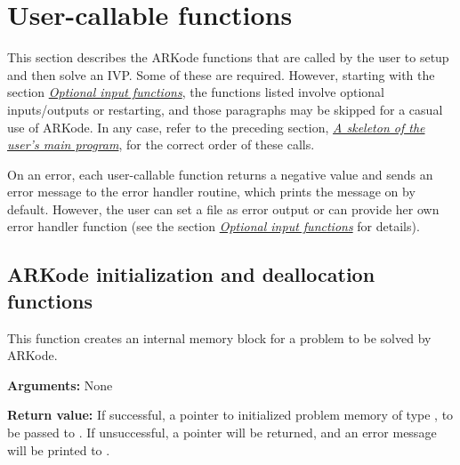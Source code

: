 \documentclass[letterpaper,10pt,english]{sphinxmanual}
\begin{document}
\section{User-callable functions}
\label{c_interface/User_callable::doc}\label{c_interface/User_callable:user-callable-functions}\label{c_interface/User_callable:cinterface-usercallable}
This section describes the ARKode functions that are called by the
user to setup and then solve an IVP. Some of these are
required. However, starting with the section
{\hyperref[c_interface/User_callable:cinterface-optionalinputs]{\emph{Optional input functions}}}, the functions listed involve
optional inputs/outputs or restarting, and those paragraphs may be
skipped for a casual use of ARKode. In any
case, refer to the preceding section, {\hyperref[c_interface/Skeleton:cinterface-skeleton]{\emph{A skeleton of the user's main program}}}, for
the correct order of these calls.

On an error, each user-callable function returns a negative value and
sends an error message to the error handler routine, which prints the
message on  by default. However, the user can set a file as
error output or can provide her own error handler function
(see the section {\hyperref[c_interface/User_callable:cinterface-optionalinputs]{\emph{Optional input functions}}} for details).


\subsection{ARKode initialization and deallocation functions}
\label{c_interface/User_callable:arkode-initialization-and-deallocation-functions}\label{c_interface/User_callable:cinterface-initialization}

\begin{fulllineitems}
\label{c_interface/User_callable:ARKodeCreate}
This function creates an internal memory block for a problem to be
solved by ARKode.

\textbf{Arguments:}  None

\textbf{Return value:}  If successful, a pointer to initialized problem memory
of type , to be passed to {\hyperref[c_interface/User_callable:ARKodeInit]{}}.
If unsuccessful, a  pointer will be returned, and an error
message will be printed to .

\end{fulllineitems}
\end{document}
